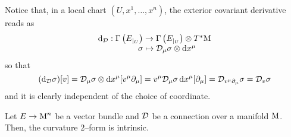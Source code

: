 \begin{remark}
Notice that, in a local chart $(U,x^1,\hdots,x^n)$, the exterior covariant derivative reads as
$$\begin{matrix}
    \text{\normalfont d}_{\mathcal{D}}:\Gamma\left(E_{|_U}\right)\to\Gamma\left(E_{|_U}\right)\otimes T^*\text{\normalfont M}\\
    \qquad\quad \sigma\mapsto\mathcal{D}_\mu\sigma\otimes\text{\normalfont d} x^\mu
\end{matrix}$$
so that
$$(\text{\normalfont d}_{\mathcal{D}}\sigma)[v]=\mathcal{D}_\mu\sigma\otimes\text{\normalfont d} x^\mu[v^\mu\partial_\mu]=v^\mu\mathcal{D}_\mu\sigma\,\text{\normalfont d} x^\mu[\partial_\mu]=\mathcal{D}_{v^\mu\partial_\mu}\sigma=\mathcal{D}_v\sigma$$
and it is clearly independent of the choice of coordinate.    
\end{remark}

\begin{teo}\label{curvature_is_intr}
    Let $E\to\text{\normalfont M}^n$ be a vector bundle and $\mathcal{D}$ be a connection over a manifold $\text{\normalfont M}$. Then, the curvature $2$--form is intrinsic.
\end{teo}
